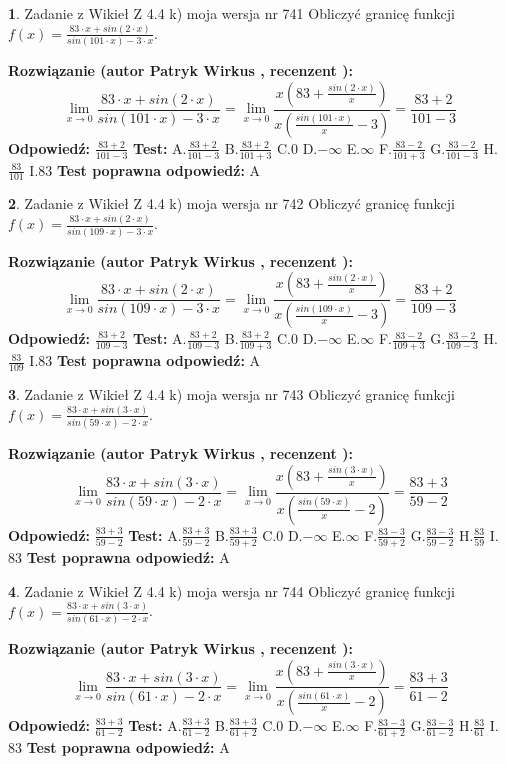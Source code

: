 \documentclass[12pt, a4paper]{article}
\theoremstyle{definition} %
\newtheorem{zad}{}
\newcommand{\zadStart}[1]{\begin{zad}#1\newline}
\newcommand{\zadStop}{\end{zad}}
\newcommand{\rozwStart}[2]{\noindent \textbf{Rozwiązanie (autor #1 , recenzent #2): }\newline}
\newcommand{\rozwStop}{\newline}
\newcommand{\odpStart}{\noindent \textbf{Odpowiedź:}\newline}
\newcommand{\odpStop}{\newline}
\newcommand{\testStart}{\noindent \textbf{Test:}\newline}
\newcommand{\testStop}{\newline}
\newcommand{\kluczStart}{\noindent \textbf{Test poprawna odpowiedź:}\newline}
\newcommand{\kluczStop}{\newline}
\begin{document}
\zadStart{Zadanie z Wikieł Z 4.4 k) moja wersja nr 741}
Obliczyć granicę funkcji $f(x)=\frac{83\cdot x +sin(2\cdot x)}{sin(101\cdot x) -3\cdot x}$.
\zadStop
\rozwStart{Patryk Wirkus}{}
$$\lim\limits_{x\to 0}\frac{83\cdot x +sin(2\cdot x)}{sin(101\cdot x) -3\cdot x}
=\lim\limits_{x\to 0}\frac{x(83+\frac{sin(2\cdot x)}{x})}{x(\frac{sin(101\cdot x)}{x}-3)}
=\frac{83+2}{101-3}$$
\rozwStop
\odpStart
$\frac{83+2}{101-3}$
\odpStop
\testStart
A.$\frac{83+2}{101-3}$
B.$\frac{83+2}{101+3}$
C.$0$
D.$-\infty$
E.$\infty$
F.$\frac{83-2}{101+3}$
G.$\frac{83-2}{101-3}$
H.$\frac{83}{101}$
I.$83$
\testStop
\kluczStart
A
\kluczStop



\zadStart{Zadanie z Wikieł Z 4.4 k) moja wersja nr 742}
Obliczyć granicę funkcji $f(x)=\frac{83\cdot x +sin(2\cdot x)}{sin(109\cdot x) -3\cdot x}$.
\zadStop
\rozwStart{Patryk Wirkus}{}
$$\lim\limits_{x\to 0}\frac{83\cdot x +sin(2\cdot x)}{sin(109\cdot x) -3\cdot x}
=\lim\limits_{x\to 0}\frac{x(83+\frac{sin(2\cdot x)}{x})}{x(\frac{sin(109\cdot x)}{x}-3)}
=\frac{83+2}{109-3}$$
\rozwStop
\odpStart
$\frac{83+2}{109-3}$
\odpStop
\testStart
A.$\frac{83+2}{109-3}$
B.$\frac{83+2}{109+3}$
C.$0$
D.$-\infty$
E.$\infty$
F.$\frac{83-2}{109+3}$
G.$\frac{83-2}{109-3}$
H.$\frac{83}{109}$
I.$83$
\testStop
\kluczStart
A
\kluczStop



\zadStart{Zadanie z Wikieł Z 4.4 k) moja wersja nr 743}
Obliczyć granicę funkcji $f(x)=\frac{83\cdot x +sin(3\cdot x)}{sin(59\cdot x) -2\cdot x}$.
\zadStop
\rozwStart{Patryk Wirkus}{}
$$\lim\limits_{x\to 0}\frac{83\cdot x +sin(3\cdot x)}{sin(59\cdot x) -2\cdot x}
=\lim\limits_{x\to 0}\frac{x(83+\frac{sin(3\cdot x)}{x})}{x(\frac{sin(59\cdot x)}{x}-2)}
=\frac{83+3}{59-2}$$
\rozwStop
\odpStart
$\frac{83+3}{59-2}$
\odpStop
\testStart
A.$\frac{83+3}{59-2}$
B.$\frac{83+3}{59+2}$
C.$0$
D.$-\infty$
E.$\infty$
F.$\frac{83-3}{59+2}$
G.$\frac{83-3}{59-2}$
H.$\frac{83}{59}$
I.$83$
\testStop
\kluczStart
A
\kluczStop



\zadStart{Zadanie z Wikieł Z 4.4 k) moja wersja nr 744}
Obliczyć granicę funkcji $f(x)=\frac{83\cdot x +sin(3\cdot x)}{sin(61\cdot x) -2\cdot x}$.
\zadStop
\rozwStart{Patryk Wirkus}{}
$$\lim\limits_{x\to 0}\frac{83\cdot x +sin(3\cdot x)}{sin(61\cdot x) -2\cdot x}
=\lim\limits_{x\to 0}\frac{x(83+\frac{sin(3\cdot x)}{x})}{x(\frac{sin(61\cdot x)}{x}-2)}
=\frac{83+3}{61-2}$$
\rozwStop
\odpStart
$\frac{83+3}{61-2}$
\odpStop
\testStart
A.$\frac{83+3}{61-2}$
B.$\frac{83+3}{61+2}$
C.$0$
D.$-\infty$
E.$\infty$
F.$\frac{83-3}{61+2}$
G.$\frac{83-3}{61-2}$
H.$\frac{83}{61}$
I.$83$
\testStop
\kluczStart
A
\kluczStop
\end{document}
